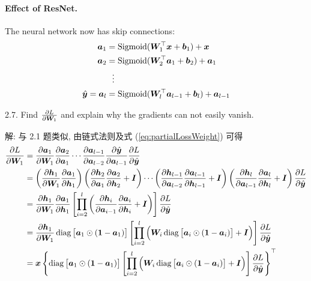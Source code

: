 \documentclass{article}
\begin{document}
\paragraph{Effect of ResNet.} The neural network now has skip connections: 
\begin{equation}
  \begin{aligned}
    \bm{a}_1&=\mathrm{Sigmoid}(\bm{W}_1^\top\bm{x}+\bm{b}_1)+\bm{x}\\
    \bm{a}_2&=\mathrm{Sigmoid}(\bm{W}_2^\top\bm{a}_1+\bm{b}_2)+\bm{a}_1\\
    &~~\vdots\\
    \hat{\bm{y}}=\bm{a}_l&=\mathrm{Sigmoid}(\bm{W}_l^\top\bm{a}_{l-1}+\bm{b}_l)+\bm{a}_{l-1}\\
  \end{aligned}
\end{equation}

2.7. Find $\frac{\partial L}{\partial \bm{W}_1}$ and explain why the gradients can not easily vanish.

解: 与 2.1 题类似, 由链式法则及式 (\ref{eq:partialLossWeight}) 可得
\begin{equation}
  \begin{aligned}
    \frac{\partial L}{\partial\bm{W}_1}
    &=\frac{\partial\bm{a}_1}{\partial\bm{W}_1}\frac{\partial\bm{a}_{2}}{\partial\bm{a}_{1}}\cdots\frac{\partial\bm{a}_{l-1}}{\partial\bm{a}_{l-2}}\frac{\partial\hat{\bm{y}}}{\partial\bm{a}_{l-1}}\frac{\partial L}{\partial\hat{\bm{y}}}\\
    &=\left(\frac{\partial\bm{h}_1}{\partial\bm{W}_1}
    \frac{\partial\bm{a}_{1}}{\partial\bm{h}_{1}}\right)
    \left(\frac{\partial\bm{h}_2}{\partial\bm{a}_1}
    \frac{\partial\bm{a}_{2}}{\partial\bm{h}_{2}}+\bm{I}\right)
    \cdots
    \left(\frac{\partial\bm{h}_{l-1}}{\partial\bm{a}_{l-2}}
    \frac{\partial\bm{a}_{l-1}}{\partial\bm{h}_{l-1}}+\bm{I}\right)
    \left(\frac{\partial\bm{h}_{l}}{\partial\bm{a}_{l-1}}
    \frac{\partial\bm{a}_l}{\partial\bm{h}_{l}}+\bm{I}\right)
    \frac{\partial L}{\partial\hat{\bm{y}}}\\
    &=\frac{\partial\bm{h}_1}{\partial\bm{W}_1}
    \frac{\partial\bm{a}_{1}}{\partial\bm{h}_{1}}
    \left[
      \prod_{i=2}^l
      \left(
        \frac{\partial\bm{h}_i}{\partial\bm{a}_{i-1}}
        \frac{\partial\bm{a}_{i}}{\partial\bm{h}_{i}}+\bm{I}
      \right)
    \right]
    \frac{\partial L}{\partial\hat{\bm{y}}}\\
    &=\frac{\partial\bm{h}_1}{\partial\bm{W}_1}
    \operatorname{diag}\big[\bm{a}_1\odot(\bm{1}-\bm{a}_1)\big]
    \left[
      \prod_{i=2}^l\Big(\bm{W}_i\operatorname{diag}\big[\bm{a}_i\odot(\bm{1}-\bm{a}_i)\big]+\bm{I}\Big)
    \right]
    \frac{\partial L}{\partial\hat{\bm{y}}}\\
    &=\bm{x}\left\{
      \operatorname{diag}\big[\bm{a}_1\odot(\bm{1}-\bm{a}_1)\big]
      \left[
        \prod_{i=2}^l\Big(\bm{W}_i\operatorname{diag}\big[\bm{a}_i\odot(\bm{1}-\bm{a}_i)\big]+\bm{I}\Big)
      \right]
      \frac{\partial L}{\partial\hat{\bm{y}}}
    \right\}^\top\\
  \end{aligned}
\end{equation}
\end{document}
